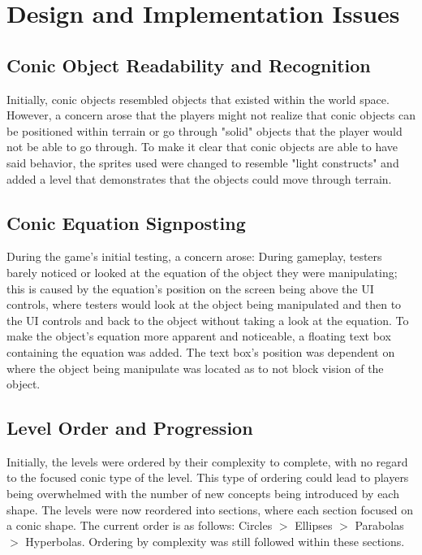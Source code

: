 %
%
%                 

\chapter{Design and Implementation Issues}
\label{sec:designAndImplementation}

\section{Conic Object Readability and Recognition}
Initially, conic objects resembled objects that existed within the world space. However, a concern arose that the players might not realize that conic objects can be positioned within terrain or go through "solid" objects that the player would not be able to go through. To make it clear that conic objects are able to have said behavior, the sprites used were changed to resemble "light constructs" and added a level that demonstrates that the objects could move through terrain.
\section{Conic Equation Signposting}
During the game's initial testing, a concern arose: During gameplay, testers barely noticed or looked at the equation of the object they were manipulating; this is caused by the equation's position on the screen being above the UI controls, where testers would look at the object being manipulated and then to the UI controls and back to the object without taking a look at the equation. To make the object's equation more apparent and noticeable, a floating text box containing the equation was added. The text box's position was dependent on where the object being manipulate was located as to not block vision of the object.
\section{Level Order and Progression}
Initially, the levels were ordered by their complexity to complete, with no regard to the focused conic type of the level. This type of ordering could lead to players being overwhelmed with the number of new concepts being introduced by each shape. The levels were now reordered into sections, where each section focused on a conic shape. The current order is as follows: Circles $>$ Ellipses $>$ Parabolas $>$ Hyperbolas. Ordering by complexity was still followed within these sections.